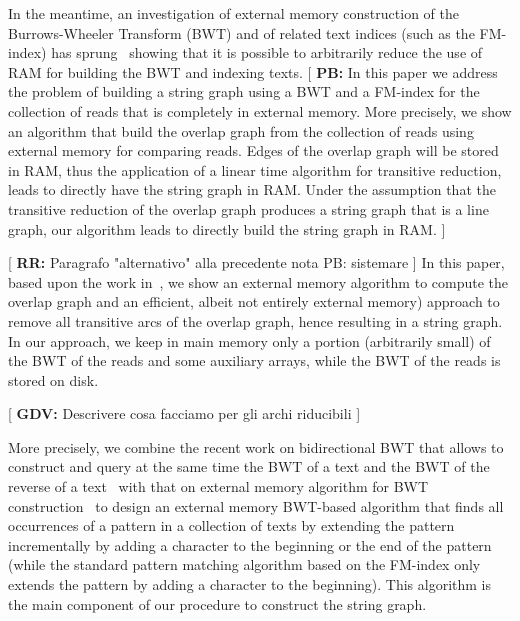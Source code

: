 \documentclass[runningheads,envcountsame,a4paper]{llncs}
\newcommand{\notaestesa}[2]{%
 \marginpar{\color{red!75!black}\textbf{\texttimes}}%
 {\color{red!75!black}%
 [\,\textbullet\,\textsf{\textbf{#1:}} %
 \textsf{\footnotesize#2}\,\textbullet\,]}%
}
\begin{document}
In the meantime, an investigation of external memory construction of the
Burrows-Wheeler Transform (BWT) and of related text indices (such as the
FM-index) has sprung~\cite{Bauer2011,Bauer2013,Ferragina2012} showing that it is possible to
arbitrarily reduce the use of RAM for building the BWT and indexing texts.
\notaestesa{PB}{In this paper we address the problem of
building a string graph using a BWT and a FM-index for the collection of reads that is completely in  external  memory.
More precisely, we show an algorithm that  build  the overlap graph from the collection of reads using external memory for comparing reads.
Edges of the overlap graph will be stored in RAM, thus the application of a  linear time algorithm for transitive  reduction, leads
to directly have the string graph in RAM.
Under the assumption that the transitive reduction of the overlap graph produces a string graph that is a line graph,  our algorithm
leads to directly build the string graph in RAM.}

\notaestesa{RR}{Paragrafo "alternativo" alla precedente nota PB: sistemare} In this paper, based upon the work in~\cite{Bauer2011}, we show an external
memory algorithm to compute the overlap graph and an efficient, albeit not
entirely external memory) approach to remove all transitive arcs of the overlap
graph, hence resulting in a string graph.
%
%
In our approach, we keep in main memory only a portion (arbitrarily small)
of the BWT of the reads and some auxiliary arrays, while the BWT of the reads is
stored on disk.

\notaestesa{GDV}{ Descrivere cosa facciamo per gli archi riducibili}

More precisely, we combine the recent work on bidirectional BWT that allows to
construct and query at the same time the BWT of a text and the BWT of the
reverse of a text~\cite{Lam2009} with that on external memory algorithm for BWT
construction~\cite{Bauer2011} to design an external memory BWT-based algorithm
that finds all occurrences of a pattern in a collection of texts by extending
the pattern incrementally by adding a character to the beginning or the end of
the pattern (while the standard pattern matching algorithm based on the FM-index
only extends the pattern by adding a character to the beginning).
This algorithm is the main component of our procedure to construct the string graph.
\end{document}
